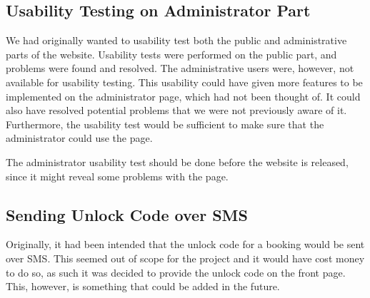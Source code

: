 \subsection{Usability Testing on Administrator Part}
We had originally wanted to usability test both the public and administrative parts of the website.
Usability tests were performed on the public part, and problems were found and resolved. 
The administrative users were, however, not available for usability testing.
This usability could have given more features to be implemented on the administrator page, which had not been thought of.
It could also have resolved potential problems that we were not previously aware of it.
Furthermore, the usability test would be sufficient to make sure that the administrator could use the page.

The administrator usability test should be done before the website is released, since it might reveal some problems with the page.

\subsection{Sending Unlock Code over SMS}
Originally, it had been intended that the unlock code for a booking would be sent over SMS. 
This seemed out of scope for the project and it would have cost money to do so, as such it was decided to provide the unlock code on the front page. 
This, however, is something that could be added in the future.
